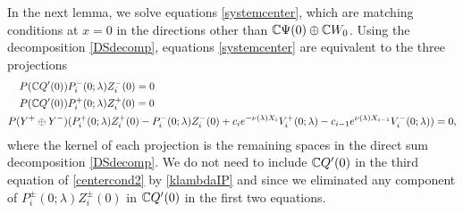 \documentclass[10pt,reqno]{amsart}
\theoremstyle{plain}
\theoremstyle{definition}
\theoremstyle{remark}
\numberwithin{theorem}{section}
\numberwithin{equation}{section}
\begin{document}
In the next lemma, we solve equations \cref{systemcenter}, which are matching conditions at $x = 0$ in the directions other than $\mathbb{C} \Psi(0) \oplus \mathbb{C} W_0$. Using the decomposition \cref{DSdecomp}, equations \cref{systemcenter} are equivalent to the three projections
\begin{equation}\label{centercond2}
\begin{aligned}
P(\mathbb{C} Q'(0) ) &P_i^-(0; \lambda) Z_i^-(0) = 0 \\
P(\mathbb{C} Q'(0) ) &P_i^+(0; \lambda) Z_i^+(0) = 0 \\
P(Y^+ \oplus Y^-) &( P_i^+(0; \lambda)Z_i^+(0) - P_i^-(0; \lambda) Z_i^-(0) + c_i e^{-\nu(\lambda)X_i}V_i^+(0; \lambda) - c_{i-1} e^{\nu(\lambda)X_{i-1}} V_i^-(0; \lambda) ) = 0,
\end{aligned}
\end{equation}
where the kernel of each projection is the remaining spaces in the direct sum decomposition \eqref{DSdecomp}. We do not need to include $\mathbb{C} Q'(0)$ in the third equation of \eqref{centercond2} by \cref{klambdaIP} and since we eliminated any component of $P_i^\pm(0; \lambda) Z_i^\pm(0)$ in $\mathbb{C} Q'(0)$ in the first two equations.
\end{document}
